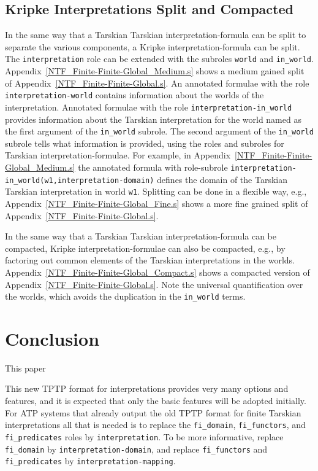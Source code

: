 \documentclass{easychair}
\begin{document}
\subsection{Kripke Interpretations Split and Compacted}
\label{NewKripkeSplitCompact}

In the same way that a Tarskian Tarskian interpretation-formula can be split to separate the
various components, a Kripke interpretation-formula can be split.
The {\tt interpretation} role can be extended with the subroles {\tt world} and {\tt in\_world}.
Appendix~\ref{NTF_Finite-Finite-Global_Medium.s} shows a medium gained split of 
Appendix~\ref{NTF_Finite-Finite-Global.s}.
An annotated formulae with the role {\tt interpretation-world} contains information about the
worlds of the interpretation.
Annotated formulae with the role {\tt interpretation-in\_world} provides information about the
Tarskian interpretation for the world named as the first argument of the {\tt in\_world} subrole.
The second argument of the {\tt in\_world} subrole tells what information is provided, using the
roles and subroles for Tarskian interpretation-formulae.
For example, in Appendix~\ref{NTF_Finite-Finite-Global_Medium.s} the annotated formula with
role-subrole {\tt interpretation-in\_world(w1,interpretation-domain)} defines the domain of the
Tarskian Tarskian interpretation in world {\tt w1}.
Splitting can be done in a flexible way, e.g., Appendix~\ref{NTF_Finite-Finite-Global_Fine.s}
shows a more fine grained split of Appendix~\ref{NTF_Finite-Finite-Global.s}.

In the same way that a Tarskian Tarskian interpretation-formula can be compacted, Kripke
interpretation-formulae can also be compacted, e.g., by factoring out common elements of
the Tarskian interpretations in the worlds.
Appendix~\ref{NTF_Finite-Finite-Global_Compact.s} shows a compacted version of
Appendix~\ref{NTF_Finite-Finite-Global.s}.
Note the universal quantification over the worlds, which avoids the duplication in the 
{\tt in\_world} terms.

\section{Conclusion}
\label{Conclusion}

This paper 

This new TPTP format for interpretations provides very many options and features, and it is
expected that only the basic features will be adopted initially. 
For ATP systems that already output the old TPTP format for finite Tarskian interpretations
all that is needed is to replace the {\tt fi\_domain}, {\tt fi\_functors}, and {\tt fi\_predicates}
roles by {\tt interpretation}. 
To be more informative, replace {\tt fi\_domain} by {\tt interpretation-domain}, and replace
{\tt fi\_functors} and {\tt fi\_predicates} by {\tt interpretation-mapping}.
\end{document}
